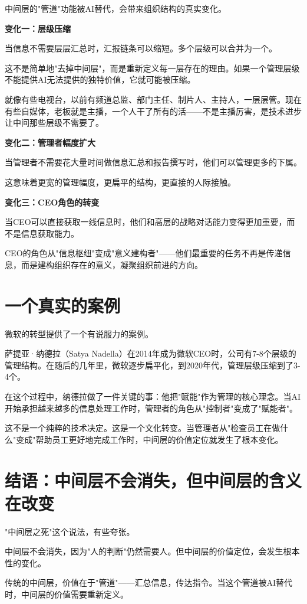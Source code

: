 中间层的"管道"功能被AI替代，会带来组织结构的真实变化。

\textbf{变化一：层级压缩}

当信息不需要层层汇总时，汇报链条可以缩短。多个层级可以合并为一个。

这不是简单地"去掉中间层"，而是重新定义每一层存在的理由。如果一个管理层级不能提供AI无法提供的独特价值，它就可能被压缩。

就像有些电视台，以前有频道总监、部门主任、制片人、主持人，一层层管。现在有些自媒体，老板就是主播，一个人干了所有的活——不是主播厉害，是技术进步让中间那些层级不需要了。

\textbf{变化二：管理者幅度扩大}

当管理者不需要花大量时间做信息汇总和报告撰写时，他们可以管理更多的下属。

这意味着更宽的管理幅度，更扁平的结构，更直接的人际接触。

\textbf{变化三：CEO角色的转变}

当CEO可以直接获取一线信息时，他们和高层的战略对话能力变得更加重要，而不是信息获取能力。

CEO的角色从"信息枢纽"变成"意义建构者"——他们最重要的任务不再是传递信息，而是建构组织存在的意义，凝聚组织前进的方向。

\section{一个真实的案例}


微软的转型提供了一个有说服力的案例。

萨提亚·纳德拉（Satya Nadella）在2014年成为微软CEO时，公司有7-8个层级的管理结构。在随后的几年里，微软逐步扁平化，到2020年代，管理层级压缩到了3-4个。

在这个过程中，纳德拉做了一件关键的事：他把"赋能"作为管理的核心理念。当AI开始承担越来越多的信息处理工作时，管理者的角色从"控制者"变成了"赋能者"。

这不是一个纯粹的技术决定。这是一个文化转变。当管理者从"检查员工在做什么"变成"帮助员工更好地完成工作时，中间层的价值定位就发生了根本变化。

\section{结语：中间层不会消失，但中间层的含义在改变}


"中间层之死"这个说法，有些夸张。

中间层不会消失，因为"人的判断"仍然需要人。但中间层的价值定位，会发生根本性的变化。

传统的中间层，价值在于"管道"——汇总信息，传达指令。当这个管道被AI替代时，中间层的价值需要重新定义。

